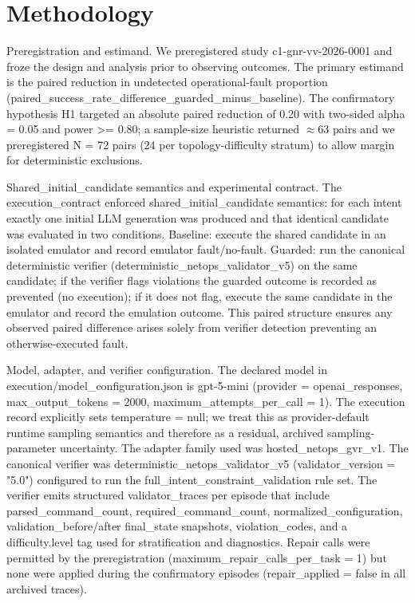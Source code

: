 \documentclass[conference]{IEEEtran}
\begin{document}
\section{Methodology}
Preregistration and estimand. We preregistered study c1-gnr-vv-2026-0001 and froze the design and analysis prior to observing outcomes. The primary estimand is the paired reduction in undetected operational‑fault proportion (paired\_success\_rate\_difference\_guarded\_minus\_baseline). The confirmatory hypothesis H1 targeted an absolute paired reduction of 0.20 with two-sided alpha = 0.05 and power >= 0.80; a sample-size heuristic returned \ensuremath{\approx}63 pairs and we preregistered N = 72 pairs (24 per topology-difficulty stratum) to allow margin for deterministic exclusions.

Shared\_initial\_candidate semantics and experimental contract. The execution\_contract enforced shared\_initial\_candidate semantics: for each intent exactly one initial LLM generation was produced and that identical candidate was evaluated in two conditions. Baseline: execute the shared candidate in an isolated emulator and record emulator fault/no-fault. Guarded: run the canonical deterministic verifier (deterministic\_netops\_validator\_v5) on the same candidate; if the verifier flags violations the guarded outcome is recorded as prevented (no execution); if it does not flag, execute the same candidate in the emulator and record the emulation outcome. This paired structure ensures any observed paired difference arises solely from verifier detection preventing an otherwise-executed fault.

Model, adapter, and verifier configuration. The declared model in execution/model\_configuration.json is gpt-5-mini (provider = openai\_responses, max\_output\_tokens = 2000, maximum\_attempts\_per\_call = 1). The execution record explicitly sets temperature = null; we treat this as provider-default runtime sampling semantics and therefore as a residual, archived sampling-parameter uncertainty. The adapter family used was hosted\_netops\_gvr\_v1. The canonical verifier was deterministic\_netops\_validator\_v5 (validator\_version = "5.0") configured to run the full\_intent\_constraint\_validation rule set. The verifier emits structured validator\_traces per episode that include parsed\_command\_count, required\_command\_count, normalized\_configuration, validation\_before/after final\_state snapshots, violation\_codes, and a difficulty.level tag used for stratification and diagnostics. Repair calls were permitted by the preregistration (maximum\_repair\_calls\_per\_task = 1) but none were applied during the confirmatory episodes (repair\_applied = false in all archived traces).
\end{document}

